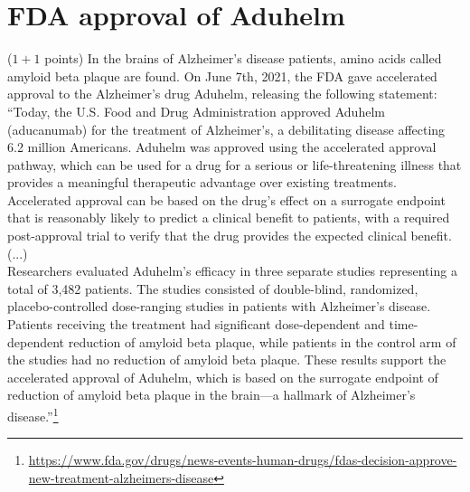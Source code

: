 \section{FDA approval of Aduhelm}
($1+1$ points) In the brains of Alzheimer's disease patients, amino acids called amyloid beta plaque are found. On June 7th, 2021, the FDA gave accelerated approval to the Alzheimer's drug Aduhelm, releasing the following statement:\\
\bigbreak
``Today, the U.S. Food and Drug Administration approved Aduhelm (aducanumab) for the treatment of Alzheimer's, a debilitating disease affecting 6.2 million Americans. Aduhelm was approved using the accelerated approval pathway, which can be used for a drug for a serious or life-threatening illness that provides a meaningful therapeutic advantage over existing treatments. Accelerated approval can be based on the drug's effect on a surrogate endpoint that is reasonably likely to predict a clinical benefit to patients, with a required post-approval trial to verify that the drug provides the expected clinical benefit.(...)\\
\bigbreak
Researchers evaluated Aduhelm's efficacy in three separate studies representing a total of 3,482 patients. The studies consisted of double-blind, randomized, placebo-controlled dose-ranging studies in patients with Alzheimer's disease. Patients receiving the treatment had significant dose-dependent and time-dependent reduction of amyloid beta plaque, while patients in the control arm of the studies had no reduction of amyloid beta plaque. These results support the accelerated approval of Aduhelm, which is based on the surrogate endpoint of reduction of amyloid beta plaque in the brain---a hallmark of Alzheimer's disease.''\footnote{\url{https://www.fda.gov/drugs/news-events-human-drugs/fdas-decision-approve-new-treatment-alzheimers-disease}}\\
